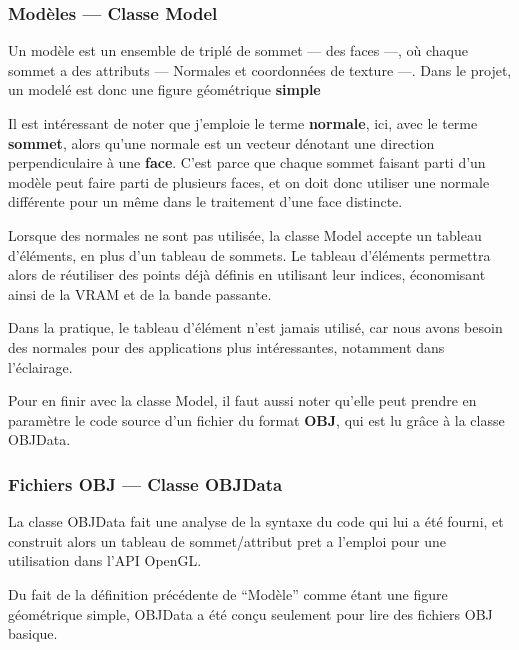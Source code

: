 \documentclass[11pt, a4paper, titlepage]{article}
\begin{document}
\subsubsection{Modèles --- Classe Model}

Un modèle est un ensemble de triplé de sommet --- des faces ---, où chaque sommet a des attributs --- Normales et coordonnées de texture ---.
Dans le projet, un modelé est donc une figure géométrique \textbf{simple}

Il est intéressant de noter que j'emploie le terme \textbf{normale}, ici, avec le terme \textbf{sommet}, alors qu'une normale est un vecteur 
dénotant une direction perpendiculaire à une \textbf{face}. C'est parce que chaque sommet faisant parti d'un modèle peut faire parti de 
plusieurs faces, et on doit donc utiliser une normale différente pour un même dans le traitement d'une face distincte.

Lorsque des normales ne sont pas utilisée, la classe Model accepte un tableau d'éléments, en plus d'un tableau de sommets. Le tableau d'éléments permettra
alors de réutiliser des points déjà définis en utilisant leur indices, économisant ainsi de la VRAM et de la bande passante.

Dans la pratique, le tableau d'élément n'est jamais utilisé, car nous avons besoin des normales pour des applications plus intéressantes, notamment dans 
l'éclairage.

Pour en finir avec la classe Model, il faut aussi noter qu'elle peut prendre en paramètre le code source d'un fichier du format \textbf{OBJ}, qui est 
lu grâce à la classe OBJData.

\pagebreak
\subsubsection{Fichiers OBJ --- Classe OBJData}

La classe OBJData fait une analyse de la syntaxe du code qui lui a été fourni, et construit alors un tableau de sommet/attribut pret a l'emploi pour une
utilisation dans l'API OpenGL.

Du fait de la définition précédente de ``Modèle'' comme étant une figure géométrique simple, OBJData a été conçu seulement pour lire des fichiers OBJ basique.
\end{document}
